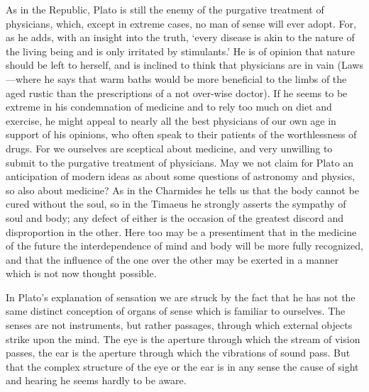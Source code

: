 As in the Republic, Plato is still the enemy of the purgative treatment of
physicians, which, except in extreme cases, no man of sense will ever
adopt. For, as he adds, with an insight into the truth, ‘every disease is
akin to the nature of the living being and is only irritated by
stimulants.’ He is of opinion that nature should be left to herself, and
is inclined to think that physicians are in vain (Laws—where he says
that warm baths would be more beneficial to the limbs of the aged rustic
than the prescriptions of a not over-wise doctor). If he seems to be
extreme in his condemnation of medicine and to rely too much on diet and
exercise, he might appeal to nearly all the best physicians of our own age
in support of his opinions, who often speak to their patients of the
worthlessness of drugs. For we ourselves are sceptical about medicine, and
very unwilling to submit to the purgative treatment of physicians. May we
not claim for Plato an anticipation of modern ideas as about some
questions of astronomy and physics, so also about medicine? As in the
Charmides he tells us that the body cannot be cured without the soul, so
in the Timaeus he strongly asserts the sympathy of soul and body; any
defect of either is the occasion of the greatest discord and disproportion
in the other. Here too may be a presentiment that in the medicine of the
future the interdependence of mind and body will be more fully recognized,
and that the influence of the one over the other may be exerted in a
manner which is not now thought possible.


In Plato’s explanation of sensation we are struck by the fact that he has
not the same distinct conception of organs of sense which is familiar to
ourselves. The senses are not instruments, but rather passages, through
which external objects strike upon the mind. The eye is the aperture
through which the stream of vision passes, the ear is the aperture through
which the vibrations of sound pass. But that the complex structure of the
eye or the ear is in any sense the cause of sight and hearing he seems
hardly to be aware.

